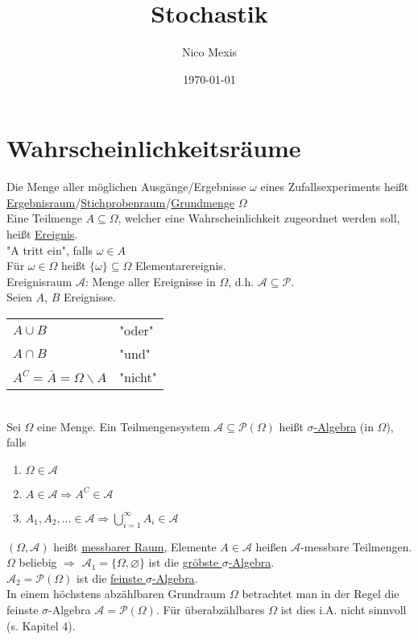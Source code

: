 \documentclass[a4paper]{article}
\title{Stochastik}
\author{Nico Mexis}
\date{\today}
\newcommand{\ul}{\underline}
\begin{document}
\maketitle
\newpage

\tableofcontents
\newpage

\section{Wahrscheinlichkeitsräume}
Die Menge aller möglichen Ausgänge/Ergebnisse $\omega$ eines Zufallsexperiments heißt \ul{Ergebnisraum}/\ul{Stichprobenraum}/\ul{Grundmenge} $\Omega$\\
Eine Teilmenge $A\subseteq \Omega$, welcher eine Wahrscheinlichkeit zugeordnet werden soll, heißt \ul{Ereignis}.\\
"A tritt ein", falls $\omega\in A$\\
Für $\omega\in\Omega$ heißt $\{\omega\}\subseteq\Omega$ Elementarereignis.\\
Ereignisraum $\mathcal{A}$: Menge aller Ereignisse in $\Omega$, d.h. $\mathcal{A}\subseteq\mathcal{P}$.\\
Seien $A$, $B$ Ereignisse.\\
\begin{tabular}{ll}
$A\cup B$ & "oder"\\
$A\cap B$ & "und"\\
$A^C=\overline{A}=\Omega\backslash A$ & "nicht"
\end{tabular}\\
Sei $\Omega$ eine Menge. Ein Teilmengensystem $\mathcal{A}\subseteq\mathcal{P}(\Omega)$ heißt \ul{$\sigma$-Algebra} (in $\Omega$), falls
\begin{enumerate}[1)]
	\item $\Omega\in\mathcal{A}$
	\item $A\in\mathcal{A}\Rightarrow A^C\in\mathcal{A}$
	\item $A_1,A_2,\dots\in \mathcal{A}\Rightarrow \bigcup_{i=1}^\infty A_i\in\mathcal{A}$
\end{enumerate}
$(\Omega,\mathcal{A})$ heißt \ul{messbarer Raum}, Elemente $A\in\mathcal{A}$ heißen $\mathcal{A}$-messbare Teilmengen.\\
$\Omega$ beliebig $\Rightarrow$ $\mathcal{A}_1=\{\Omega,\varnothing\}$ ist die \ul{gröbste $\sigma$-Algebra}.\\
$\mathcal{A}_2=\mathcal{P}(\Omega)$ ist die \ul{feinste $\sigma$-Algebra}.\\
In einem höchstens abzählbaren Grundraum $\Omega$ betrachtet man in der Regel die feinste $\sigma$-Algebra $\mathcal{A}=\mathcal{P}(\Omega)$. Für überabzählbares $\Omega$ ist dies i.A. nicht sinnvoll (s. Kapitel 4).\\
\end{document}
